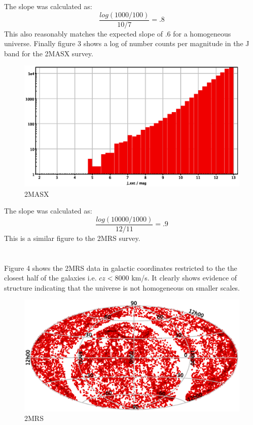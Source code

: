 \documentclass[a4paper,12pt]{article}
\begin{document}
The slope was calculated as:
\begin{equation}
\frac{log(1000/100)}{10/7}=.8
\end{equation}
This also reasonably matches the expected slope of .6 for a homogeneous universe.
Finally figure 3 shows a log of number counts per magnitude in the J band for the 2MASX survey.
\begin{figure}[H]
\centering
\includegraphics[width=.9\textwidth]{./2MASX.eps}
\caption{2MASX}
\label{fig:3}
\end{figure}
The slope was calculated as:
\begin{equation}
\frac{log(10000/1000)}{12/11}=.9
\end{equation}
This is a similar figure to the 2MRS survey.

\section{}
Figure 4 shows the 2MRS data in galactic coordinates restricted to the the closest half of the galaxies i.e. $cz<8000$ km/s.
It clearly shows evidence of structure indicating that the universe is not homogeneous on smaller scales.
\begin{figure}[H]
\centering
\includegraphics[width=.9\textwidth]{./NearestGalaxies.eps}
\caption{2MRS}
\label{fig:4}
\end{figure}


\end{document}
